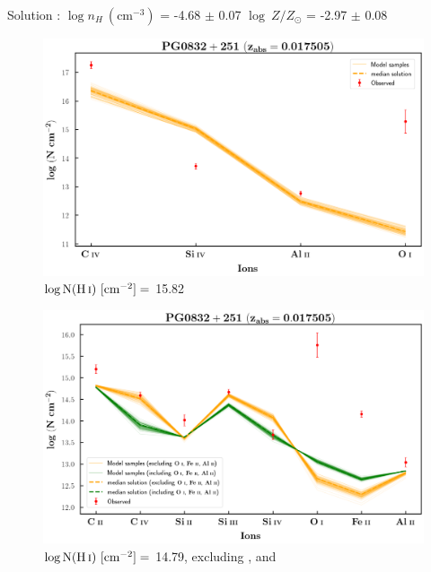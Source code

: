   Solution : $\log n_H \ (\text{cm}^{-3})$ = -4.68 $\pm$ 0.07 \hspace{10mm} $\log \ Z/Z_\odot$ = -2.97 $\pm$ 0.08 \newline  
  
  
  \begin{figure}[!h]
      \centering
      \includegraphics[width=0.9\linewidth]{Ionisation-Modelling-Plots/pg0832-z=0.017505-compI_logZ=-1.png}
      \caption{$\log \text{N}(\ion{H}{i}) \ [\text{cm}^{-2}]=$ 15.82}
  \end{figure}
  
  \newpage
  
  \begin{figure}[!h]
      \centering
      \includegraphics[width=0.85\linewidth]{Ionisation-Modelling-Plots/pg0832-z=0.017505-compII_logZ=-1_OI_FeII__AlII.png}
      \caption{$\log \text{N}(\ion{H}{i}) \ [\text{cm}^{-2}]=$ 14.79, excluding ,  and }
  \end{figure}
  
